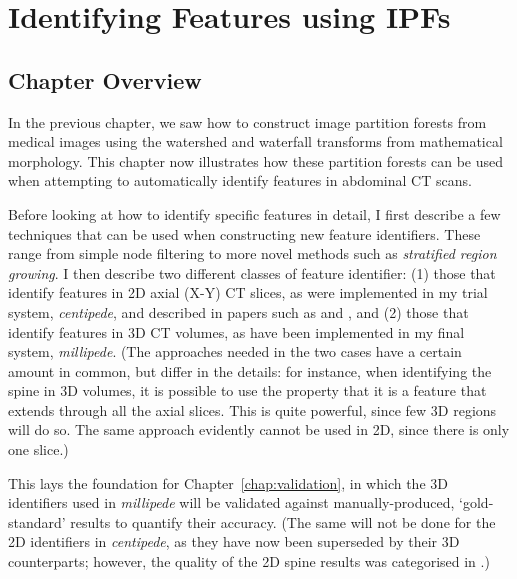 \chapter{Identifying Features using IPFs}
\label{chap:featureid}

\vspace{-\baselineskip}

\section{Chapter Overview}

In the previous chapter, we saw how to construct image partition forests from medical images using the watershed and waterfall transforms from mathematical morphology. This chapter now illustrates how these partition forests can be used when attempting to automatically identify features in abdominal CT scans.

Before looking at how to identify specific features in detail, I first describe a few techniques that can be used when constructing new feature identifiers. These range from simple node filtering to more novel methods such as \emph{stratified region growing}. I then describe two different classes of feature identifier: (1) those that identify features in 2D axial (X-Y) CT slices, as were implemented in my trial system, \emph{centipede}, and described in papers such as \cite{gvccimi08} and \cite{gvcispa09}, and (2) those that identify features in 3D CT volumes, as have been implemented in my final system, \emph{millipede}. (The approaches needed in the two cases have a certain amount in common, but differ in the details: for instance, when identifying the spine in 3D volumes, it is possible to use the property that it is a feature that extends through all the axial slices. This is quite powerful, since few 3D regions will do so. The same approach evidently cannot be used in 2D, since there is only one slice.)

This lays the foundation for Chapter~\ref{chap:validation}, in which the 3D identifiers used in \emph{millipede} will be validated against manually-produced, `gold-standard' results to quantify their accuracy. (The same will not be done for the 2D identifiers in \emph{centipede}, as they have now been superseded by their 3D counterparts; however, the quality of the 2D spine results was categorised in \cite{gvcispa09}.)

